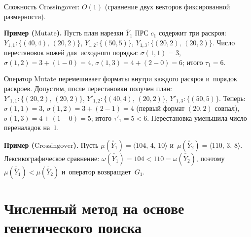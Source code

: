 \begin{center}
\label{alg:crossingover}
\end{center}


Сложность $\mathrm{Crossingover}$: $O(1)$ (сравнение двух векторов фиксированной размерности).

\textbf{Пример ($\mathrm{Mutate}$).}
Пусть план нарезки $\overline{Y}_1$ ПРС $c_1$ содержит три раскроя:
$Y_{1,1}:\{(40,4),\,(20,2)\}$, $Y_{1,2}:\{(50,5)\}$, $Y_{1,3}:\{(20,2),\,(20,2)\}$.
Число перестановок ножей для~исходного порядка: $\sigma(1,1)=3$, $\sigma(1,2)=3+(1-0)=4$, $\sigma(1,3)=4+(2-0)=6$; итого $\tau_1=6$.

Оператор $\mathrm{Mutate}$ перемешивает форматы внутри каждого раскроя и~порядок раскроев.
Допустим, после перестановки получен план:
$Y'_{1,1}:\{(20,2),\,(20,2)\}$, $Y'_{1,2}:\{(40,4),\,(20,2)\}$, $Y'_{1,3}:\{(50,5)\}$.
Теперь: $\sigma(1,1)=3$, $\sigma(1,2)=3+(2-1)=4$ (первый формат $(20,2)$ совпал), $\sigma(1,3)=4+(1-0)=5$; итого $\tau'_1=5<6$.
Перестановка уменьшила число переналадок на~$1$.

\textbf{Пример ($\mathrm{Crossingover}$).}
Пусть $\mu(\overline{\overline{Y}}_1)=\langle 104,\,4,\,10\rangle$ и~$\mu(\overline{\overline{Y}}_2)=\langle 110,\,3,\,8\rangle$.
Лексикографическое сравнение: $\omega(\overline{\overline{Y}}_1)=104<110=\omega(\overline{\overline{Y}}_2)$, поэтому $\mu(\overline{\overline{Y}}_1)<\mu(\overline{\overline{Y}}_2)$ и~оператор возвращает~$G_1$.

\section{Численный метод на основе генетического поиска}\label{sec:alg/genetic_search}

